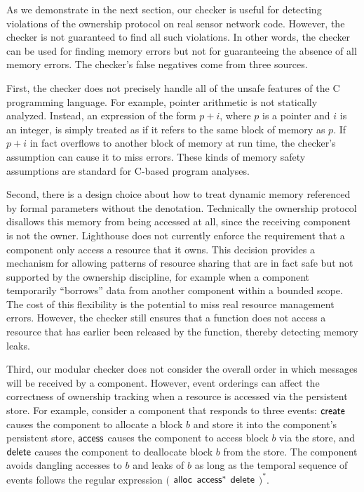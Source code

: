 As we demonstrate in the next section, our checker is useful for detecting
violations of the ownership protocol on real sensor network code.  
%
However, the checker is not guaranteed to find all such violations.  
%
In other words, the checker can be used for finding memory errors but not
for guaranteeing the absence of all memory errors.  
%
The checker's false negatives come from three sources.



First, the checker does not precisely handle all of the unsafe features of
the C programming language.  
%
For example, pointer arithmetic is not statically analyzed.  
%
Instead, an expression of the form $p+i$, where $p$ is a pointer and $i$ is
an integer, is simply treated as if it refers to the same block of memory as
$p$.  
%
If $p+i$ in fact overflows to another block of memory at run time, the
checker's assumption can cause it to miss errors.  
%
These kinds of memory safety assumptions are standard for C-based
program analyses.



Second, there is a design choice about how to treat dynamic memory
referenced by formal parameters without the  denotation.
%
Technically the ownership protocol disallows this memory from being
accessed at all, since the receiving component is not the owner.  
%
Lighthouse does not currently enforce the requirement that a component only
access a resource that it owns.
% 
%
This decision 
provides a mechanism for allowing patterns of resource
sharing that are in fact safe but not supported by the ownership discipline,
for example when a component temporarily ``borrows'' data from another
component within a bounded scope.
%
The cost of this flexibility is the potential to miss real resource
management errors.
%
However, the checker still ensures that a function does not access a
resource that has earlier been released by the function, thereby detecting
memory leaks.



Third, our modular checker does not consider the overall order in which
messages will be received by a component.  
%
However, event orderings can affect the correctness of ownership tracking
when a resource is accessed via the persistent store.
%
For example, consider a component that responds to three events: ${\mathsf{create}}$
causes the component to allocate a block $b$ and store it into the
component's persistent store, ${\mathsf{access}}$ causes the component to access block
$b$ via the store, and ${\mathsf{delete}}$ causes the component to deallocate block
$b$ from the store.  
%
The component avoids dangling accesses to $b$ and leaks of $b$ as long as
the temporal sequence of events follows the regular expression $($ ${\mathsf{alloc}}$
${\mathsf{access}}^*$ ${\mathsf{delete}}$ $)^*$.  



